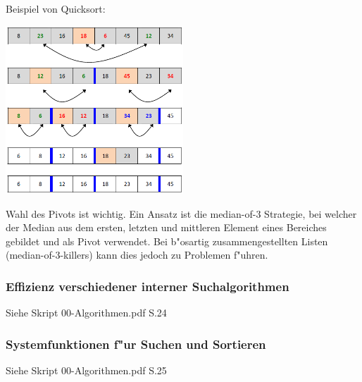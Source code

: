 Beispiel von Quicksort: \\
\begin{center}
{\includegraphics[width=0.5\textwidth]{images/Algorithmen/Quicksort.png}}
\label{Fig: Quicksort}
\end{center}

Wahl des Pivots ist wichtig. Ein Ansatz ist die median-of-3 Strategie, bei welcher der Median aus dem ersten, letzten und mittleren Element eines Bereiches gebildet und als Pivot verwendet. Bei b"osartig zusammengestellten Listen (median-of-3-killers) kann dies jedoch zu Problemen f"uhren.\\

\subsubsection{Effizienz verschiedener interner Suchalgorithmen}
Siehe Skript 00-Algorithmen.pdf S.24

\subsubsection{Systemfunktionen f"ur Suchen und Sortieren}
Siehe Skript 00-Algorithmen.pdf S.25